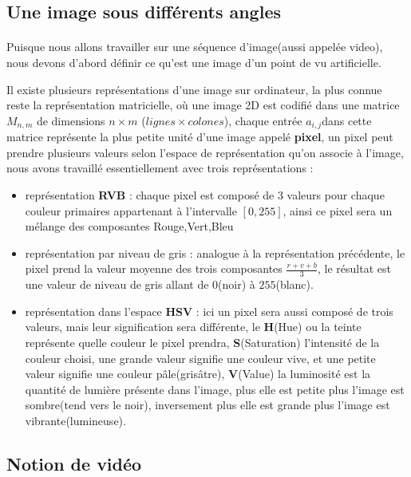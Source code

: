 \documentclass[12pt]{report}
\begin{document}
		\subsection{Une image sous différents angles}
		\paragraph{}
		Puisque nous allons travailler sur une séquence d'image(aussi appelée video), nous devons
		d'abord définir ce qu'est une image d'un point de vu artificielle.
		\par
		Il existe plusieurs représentations d'une image sur ordinateur, la plus connue reste la 
		représentation matricielle, où une image 2D est codifié dans une matrice $M_{n,m}$ de 
		dimensions $n\times m$ ($lignes \times colones$), chaque entrée $a_{i,j}$dans cette matrice 
		représente la plus petite unité d'une image appelé \textbf{pixel}, un pixel peut prendre
		plusieurs valeurs selon l'espace de représentation qu'on associe à l'image, nous avons
		travaillé essentiellement avec trois représentations : 
		\begin{itemize}
			\item représentation \textbf{RVB} : chaque pixel est composé de 3 valeurs pour chaque
			couleur primaires appartenant à l'intervalle $\left[0,255\right]$, ainsi ce pixel sera
			un mélange des composantes Rouge,Vert,Bleu
			
			\item représentation par niveau de gris : analogue à la représentation précédente, 
			le pixel prend la valeur moyenne des trois composantes $\frac{r+v+b}{3}$, le résultat 
			est une valeur de niveau de gris allant de $0$(noir) à $255$(blanc).
			
			\item représentation dans l'espace \textbf{HSV} : ici un pixel sera aussi composé
			de trois valeurs, mais leur signification sera différente, le \textbf{H}(Hue) ou
			la teinte représente quelle couleur le pixel prendra, \textbf{S}(Saturation) l'intensité
			de la couleur choisi, une grande valeur signifie une couleur vive, et une petite valeur
			signifie une couleur pâle(grisâtre), \textbf{V}(Value) la luminosité est la quantité de 
			lumière présente dans l'image, plus elle est petite plus l'image est sombre(tend vers le noir),
			inversement plus elle est grande plus l'image est vibrante(lumineuse).
		\end{itemize} 
		\subsection{Notion de vidéo}
\end{document}
